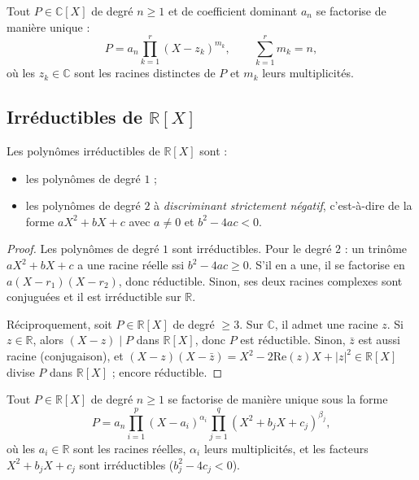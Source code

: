 \begin{corollaire}
Tout $P \in \mathbb{C}[X]$ de degré $n \ge 1$ et de coefficient dominant $a_n$ se factorise de manière unique :
\[ P = a_n \prod_{k=1}^{r} (X - z_k)^{m_k}, \qquad \sum_{k=1}^{r} m_k = n, \]
où les $z_k \in \mathbb{C}$ sont les racines distinctes de $P$ et $m_k$ leurs multiplicités.
\end{corollaire}

\subsection{Irréductibles de $\mathbb{R}[X]$}

\begin{theoreme}
Les polynômes irréductibles de $\mathbb{R}[X]$ sont :
\begin{itemize}
    \item les polynômes de degré $1$ ;
    \item les polynômes de degré $2$ à \emph{discriminant strictement négatif}, c'est-à-dire de la forme $aX^2 + bX + c$ avec $a \neq 0$ et $b^2 - 4ac < 0$.
\end{itemize}
\end{theoreme}

\begin{proof}
Les polynômes de degré $1$ sont irréductibles. Pour le degré $2$ : un trinôme $aX^2 + bX + c$ a une racine réelle ssi $b^2 - 4ac \ge 0$. S'il en a une, il se factorise en $a(X - r_1)(X - r_2)$, donc réductible. Sinon, ses deux racines complexes sont conjuguées et il est irréductible sur $\mathbb{R}$.

Réciproquement, soit $P \in \mathbb{R}[X]$ de degré $\ge 3$. Sur $\mathbb{C}$, il admet une racine $z$. Si $z \in \mathbb{R}$, alors $(X - z) \mid P$ dans $\mathbb{R}[X]$, donc $P$ est réductible. Sinon, $\bar{z}$ est aussi racine (conjugaison), et $(X - z)(X - \bar{z}) = X^2 - 2 \mathrm{Re}(z) X + |z|^2 \in \mathbb{R}[X]$ divise $P$ dans $\mathbb{R}[X]$ ; encore réductible.
\end{proof}

\begin{corollaire}
Tout $P \in \mathbb{R}[X]$ de degré $n \ge 1$ se factorise de manière unique sous la forme
\[ P = a_n \prod_{i=1}^{p} (X - a_i)^{\alpha_i} \prod_{j=1}^{q} (X^2 + b_j X + c_j)^{\beta_j}, \]
où les $a_i \in \mathbb{R}$ sont les racines réelles, $\alpha_i$ leurs multiplicités, et les facteurs $X^2 + b_j X + c_j$ sont irréductibles ($b_j^2 - 4 c_j < 0$).
\end{corollaire}

